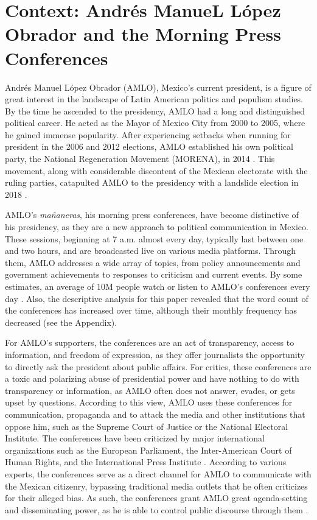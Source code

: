 \documentclass[]{article}
\begin{document}
\section{Context: Andrés ManueL López Obrador and the Morning Press Conferences}

Andrés Manuel López Obrador (AMLO), Mexico's current president, is a figure of great interest in the landscape of Latin American politics and populism studies. By the time he ascended to the presidency, AMLO had a long and distinguished political career. He acted as the Mayor of Mexico City from 2000 to 2005, where he gained immense popularity. After experiencing setbacks when running for president in the 2006 and 2012 elections, AMLO established his own political party, the National Regeneration Movement (MORENA), in 2014 \cite{navarrete_vela_morena_2019}. This movement, along with considerable discontent of the Mexican electorate with the ruling parties, catapulted AMLO to the presidency with a landslide election in 2018 \cite{moreno_viraje_nodate}. 

AMLO's \textit{mañaneras}, his morning press conferences, have become distinctive of his presidency, as they are a new approach to political communication in Mexico. These sessions, beginning at 7 a.m. almost every day, typically last between one and two hours, and are broadcasted live on various media platforms. Through them, AMLO addresses a wide array of topics, from policy announcements and government achievements to responses to criticism and current events. By some estimates, an average of 10M people watch or listen to AMLO's conferences every day \cite{bravo_5_2024}. Also, the descriptive analysis for this paper revealed that the word count of the conferences has increased over time, although their monthly frequency has decreased (see the Appendix). 

For AMLO's supporters, the conferences are an act of transparency, access to information, and freedom of expression, as they offer journalists the opportunity to directly ask the president about public affairs. For critics, these conferences are a toxic and polarizing abuse of presidential power and have nothing to do with transparency or information, as AMLO often does not answer, evades, or gets upset by questions. According to this view, AMLO uses these conferences for communication, propaganda and to attack the media and other institutions that oppose him, such as the Supreme Court of Justice or the National Electoral Institute. The conferences have been criticized by major international organizations such as the European Parliament, the Inter-American Court of Human Rights, and the International Press Institute \cite{najar_asi_2019}. According to various experts, the conferences serve as a direct channel for AMLO to communicate with the Mexican citizenry, bypassing traditional media outlets that he often criticizes for their alleged bias. As such, the conferences grant AMLO great agenda-setting and disseminating power, as he is able to control public discourse through them \cite{zapata_mananeras_2022}.
\end{document}
